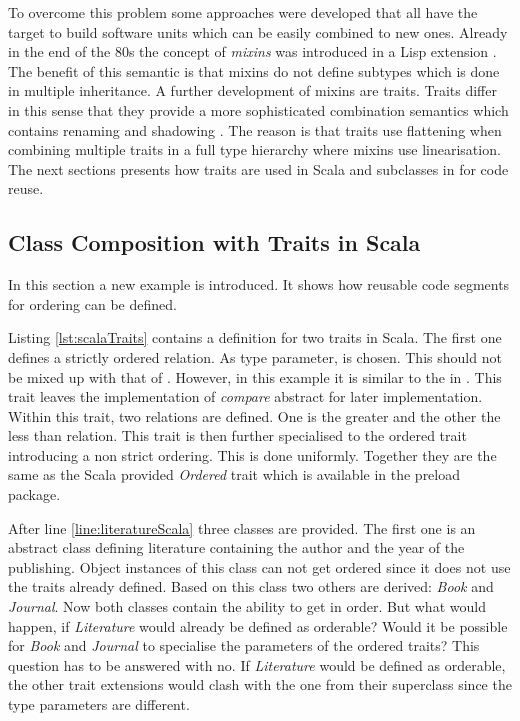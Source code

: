 To overcome this problem some approaches were developed that all
have the target to build software units which can be easily
combined to new ones. Already in the end of the 80s the concept of
\emph{mixins} was introduced
in a Lisp extension \cite{moon_object-oriented_1986}. The benefit
of this semantic is that mixins do not define subtypes which is
done in multiple inheritance. A further development of mixins are
traits. Traits differ in this sense that they provide a more
sophisticated combination semantics which contains renaming and shadowing
\cite{schaerli_traits:_2003}. The reason is that traits use flattening
when combining multiple traits in a full type hierarchy where mixins
use linearisation. The next sections presents how traits are used in
Scala and subclasses in \ooplss for code reuse.

\subsection{Class Composition with Traits in Scala}
In this section a new example is introduced. It shows how reusable code
segments for ordering can be defined.

Listing \ref{lst:scalaTraits} contains a definition for two traits
in Scala. The first one defines a strictly ordered relation. As type
parameter, \mytype is chosen. This should not be mixed up with that
of \ooplss. However, in this example it is similar to the \mytype
in \ooplss. This trait leaves the implementation of \emph{compare}
abstract for later implementation. Within this trait, two relations are
defined. One is the greater and the other the less than relation. This
trait is then further specialised to the ordered trait introducing a
non strict ordering. This is done uniformly. Together they are the same
as the Scala provided \emph{Ordered} trait which is available in the
preload package.

After line \ref{line:literatureScala} three classes are provided. The
first one is an abstract class defining literature containing the author
and the year of the publishing. Object instances of this class can not
get ordered since it does not use the traits already defined. Based on
this class two others are derived: \emph{Book} and \emph{Journal}. Now
both classes contain the ability to get in order. But what would happen,
if \emph{Literature} would already be defined as orderable? Would
it be possible for \emph{Book} and \emph{Journal} to specialise the
parameters of the ordered traits? This question has to be answered with
no. If \emph{Literature} would be defined as orderable, the other trait
extensions would clash with the one from their superclass since the type
parameters are different.

